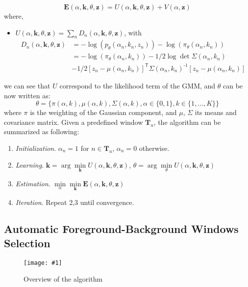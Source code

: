 \documentclass[runningheads]{llncs}
\newcommand{\inv}[1]{\ensuremath{{#1}^{\text{-}1}}}
\newcommand{\tra}[1]{\ensuremath{{#1}^{\!\mathsf{T}}}}
\newcommand{\insertF}[4]{
  \begin{figure}[h!]
    \centering
    \begin{minipage}{#3\linewidth}
    \texttt{[image: \#1]}
    \end{minipage}  
      \caption{#2}
      \label{#4}
  \end{figure}  
}
\newcommand{\bfE}{\mathbf{E}}
\newcommand{\bfz}{\mathbf{z}}
\begin{document}
\begin{equation}
 \bfE(\alpha,\mathbf{k},\theta,\bfz)=U(\alpha,\mathbf{k},\theta,\bfz)+V(\alpha,\bfz)
\end{equation}
where,
 \begin{itemize}
  \item $U(\alpha,\mathbf{k},\theta,\bfz)=\sum_n D_n(\alpha,\mathbf{k},\theta,\bfz)$, with 
  \[
  \begin{split}
  D_n(\alpha,\mathbf{k},\theta,\bfz)&=-\log(p_\theta (\alpha_n,k_n,z_n)) -\log(\pi_\theta(\alpha_n,k_n)) \\
  &=-\log(\pi_\theta(\alpha_n,k_n))-1/2\log \det \Sigma(\alpha_n,k_n)\\
  &-1/2 \tra{[z_n-\mu(\alpha_n,k_n)]}\inv{\Sigma(\alpha_n,k_n)}[z_n-\mu(\alpha_n,k_n)]
  \end{split}
  \]

 \end{itemize}
we can see that $U$ correspond to the likelihood term of the GMM, and $\theta$ can be now written as:
\[
\theta=\{\pi(\alpha,k),\mu(\alpha,k),\Sigma(\alpha,k),\alpha \in \{0,1\},k\in \{1,...,K\}\}
\]
where $\pi$ is the weighting of the Gaussian component, and $\mu$, $\Sigma$ its means and covariance matrix. Given a predefined window $\mathbf{T}_u$, the algorithm can be summarized as following:
  \begin{enumerate}
   \item \textit{Initialization}. $\alpha_n=1$ for $n\in \mathbf{T}_u$, $\alpha_n=0$ otherwise.
   \item \textit{Learning}. $\mathbf{k}=\arg\min\limits_{\mathbf{k}} U(\alpha,\mathbf{k},\theta,\bfz)$, $\theta=\arg\min\limits_{\theta} U(\alpha,\mathbf{k},\theta,\bfz)$
   \item \textit{Estimation}. $\min\limits_{\alpha}\min\limits_{\mathbf{k}}\bfE(\alpha,\mathbf{k},\theta,\bfz) $
   \item \textit{Iteration}. Repeat 2,3 until convergence.
  \end{enumerate}
\subsection{Automatic Foreground-Background Windows Selection}
\insertF{schema}{Overview of the algorithm}{1}{sch}
\end{document}
